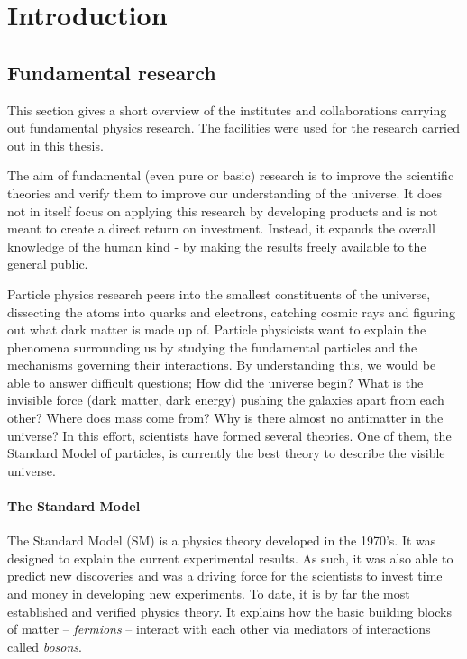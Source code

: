 \documentclass[12pt]{packages/mytustyle}  %
\begin{document}
\baselineskip=15pt



\chapter{Introduction}



\clearpage
\section{Fundamental research}
\label{sec:fundphy}
This section gives a short overview of the institutes and collaborations carrying out fundamental physics research. The facilities were used for the research carried out in this thesis. 

The aim of fundamental (even pure or basic) research is to improve the scientific theories and verify them to improve our understanding of the universe.  It does not in itself focus on applying this research by developing products and is not meant to create a direct return on investment. Instead, it expands the overall knowledge of the human kind - by making the results freely available to the general public.

Particle physics research peers into the smallest constituents of the universe, dissecting the atoms into quarks and electrons, catching cosmic rays and figuring out what dark matter is made up of. Particle physicists want to explain the phenomena surrounding us by studying the fundamental particles and the mechanisms governing their interactions. By understanding this, we would be able to answer difficult questions; How did the universe begin? What is the invisible force (dark matter, dark energy) pushing the galaxies apart from each other? Where does mass come from? Why is there almost no antimatter in the universe? In this effort, scientists have formed several theories. One of them, the Standard Model of particles, is currently the best theory to describe the visible universe.

\subsubsection{The Standard Model}
The Standard Model (SM) is a physics theory developed in the 1970's. It was designed to explain the current experimental results. As such, it was also able to predict new discoveries and was a driving force for the scientists to invest time and money in developing new experiments. To date, it is by far the most established and verified physics theory. It explains how the basic building blocks of matter -- \emph{fermions} -- interact with each other via mediators of interactions called \emph{bosons}.  
\end{document}
